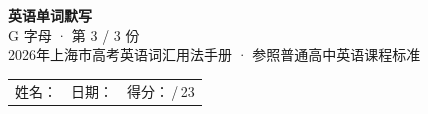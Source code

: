 \documentclass[10pt,a4paper]{article}
\begin{document}
\pagestyle{plain}

\begin{center}
{\LARGE\bfseries 英语单词默写}\\[0.22em]
{\large G 字母 · 第 3 / 3 份}\\[0.18em]
{\small 2026年上海市高考英语词汇用法手册 · 参照普通高中英语课程标准}
\end{center}

\vspace{0.25em}
\noindent\begin{tabular}{@{}p{}@{}p{}@{}p{}@{}}
姓名：\underline{\hspace{2.0cm}} & 日期：\underline{\hspace{2.0cm}} & 得分：\underline{\hspace{1.3cm}}\,/\,23 \\
\end{tabular}

\vspace{0.3em}

\vspace{0.08em}
\end{document}
